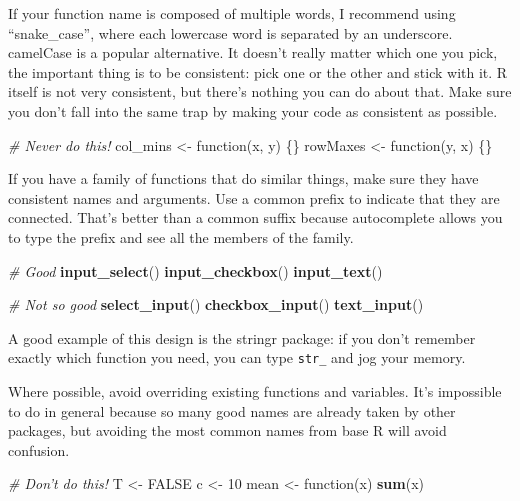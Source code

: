 \documentclass[]{book}
\newenvironment{Shaded}{\begin{snugshade}}{\end{snugshade}}
\newcommand{\KeywordTok}[1]{\textcolor[rgb]{0.13,0.29,0.53}{\textbf{{#1}}}}
\newcommand{\DecValTok}[1]{\textcolor[rgb]{0.00,0.00,0.81}{{#1}}}
\newcommand{\StringTok}[1]{\textcolor[rgb]{0.31,0.60,0.02}{{#1}}}
\newcommand{\CommentTok}[1]{\textcolor[rgb]{0.56,0.35,0.01}{\textit{{#1}}}}
\newcommand{\OtherTok}[1]{\textcolor[rgb]{0.56,0.35,0.01}{{#1}}}
\newcommand{\NormalTok}[1]{{#1}}
\begin{document}
If your function name is composed of multiple words, I recommend using
``snake\_case'', where each lowercase word is separated by an
underscore. camelCase is a popular alternative. It doesn't really matter
which one you pick, the important thing is to be consistent: pick one or
the other and stick with it. R itself is not very consistent, but
there's nothing you can do about that. Make sure you don't fall into the
same trap by making your code as consistent as possible.

\begin{Shaded}
\begin{Highlighting}[]
\CommentTok{# Never do this!}
\NormalTok{col_mins <-}\StringTok{ }\NormalTok{function(x, y) \{\}}
\NormalTok{rowMaxes <-}\StringTok{ }\NormalTok{function(y, x) \{\}}
\end{Highlighting}
\end{Shaded}

If you have a family of functions that do similar things, make sure they
have consistent names and arguments. Use a common prefix to indicate
that they are connected. That's better than a common suffix because
autocomplete allows you to type the prefix and see all the members of
the family.

\begin{Shaded}
\begin{Highlighting}[]
\CommentTok{# Good}
\KeywordTok{input_select}\NormalTok{()}
\KeywordTok{input_checkbox}\NormalTok{()}
\KeywordTok{input_text}\NormalTok{()}

\CommentTok{# Not so good}
\KeywordTok{select_input}\NormalTok{()}
\KeywordTok{checkbox_input}\NormalTok{()}
\KeywordTok{text_input}\NormalTok{()}
\end{Highlighting}
\end{Shaded}

A good example of this design is the stringr package: if you don't
remember exactly which function you need, you can type \texttt{str\_}
and jog your memory.

Where possible, avoid overriding existing functions and variables. It's
impossible to do in general because so many good names are already taken
by other packages, but avoiding the most common names from base R will
avoid confusion.

\begin{Shaded}
\begin{Highlighting}[]
\CommentTok{# Don't do this!}
\NormalTok{T <-}\StringTok{ }\OtherTok{FALSE}
\NormalTok{c <-}\StringTok{ }\DecValTok{10}
\NormalTok{mean <-}\StringTok{ }\NormalTok{function(x) }\KeywordTok{sum}\NormalTok{(x)}
\end{Highlighting}
\end{Shaded}
\end{document}
